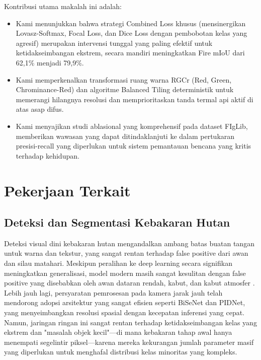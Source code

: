 \documentclass[conference]{IEEEtran}
\begin{document}
Kontribusi utama makalah ini adalah:
\begin{itemize}
    \item Kami menunjukkan bahwa strategi Combined Loss khusus (mensinergikan Lovasz-Softmax, Focal Loss, dan Dice Loss dengan pembobotan kelas yang agresif) merupakan intervensi tunggal yang paling efektif untuk ketidakseimbangan ekstrem, secara mandiri meningkatkan Fire mIoU dari 62,1\% menjadi 79,9\%.
    \item Kami memperkenalkan transformasi ruang warna RGCr (Red, Green, Chrominance-Red) dan algoritme Balanced Tiling deterministik untuk memerangi hilangnya resolusi dan memprioritaskan tanda termal api aktif di atas asap difus.
    \item Kami menyajikan studi ablasional yang komprehensif pada dataset FIgLib, memberikan wawasan yang dapat ditindaklanjuti ke dalam pertukaran presisi-recall yang diperlukan untuk sistem pemantauan bencana yang kritis terhadap kehidupan.
\end{itemize}

\section{Pekerjaan Terkait}

\subsection{Deteksi dan Segmentasi Kebakaran Hutan}
Deteksi visual dini kebakaran hutan mengandalkan ambang batas buatan tangan untuk warna dan tekstur, yang sangat rentan terhadap false positive dari awan dan silau matahari. Meskipun peralihan ke deep learning secara signifikan meningkatkan generalisasi, model modern masih sangat kesulitan dengan false positive yang disebabkan oleh awan dataran rendah, kabut, dan kabut atmosfer \cite{govil2020preliminary, nguyen2023smokeynet}. Lebih jauh lagi, persyaratan pemrosesan pada kamera jarak jauh telah mendorong adopsi arsitektur yang sangat efisien seperti BiSeNet dan PIDNet, yang menyeimbangkan resolusi spasial dengan kecepatan inferensi yang cepat. Namun, jaringan ringan ini sangat rentan terhadap ketidakseimbangan kelas yang ekstrem dan "masalah objek kecil"---di mana kebakaran tahap awal hanya menempati segelintir piksel---karena mereka kekurangan jumlah parameter masif yang diperlukan untuk menghafal distribusi kelas minoritas yang kompleks.
\end{document}
